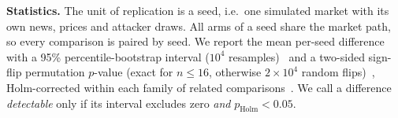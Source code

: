 \textbf{Statistics.} The unit of replication is a seed, i.e.\ one simulated market with its own news, prices and attacker draws. All arms of a seed share the market path, so every comparison is paired by seed. We report the mean per-seed difference with a 95\% percentile-bootstrap interval ($10^4$ resamples)~\cite{efron1993bootstrap} and a two-sided sign-flip permutation $p$-value (exact for $n\le 16$, otherwise $2\times10^4$ random flips)~\cite{good2005permutation}, Holm-corrected within each family of related comparisons~\cite{holm1979simple}. We call a difference \emph{detectable} only if its interval excludes zero \emph{and} $p_{\mathrm{Holm}}<0.05$.
